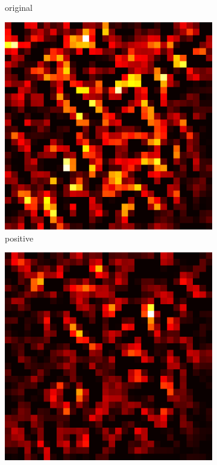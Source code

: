 \documentclass[preprint,12pt]{elsarticle}
\begin{document}
\begin{figure}
\begin{subfigure}{0.14\linewidth}
        \caption{original}
    \end{subfigure}
    \hfill
    \begin{subfigure}{0.14\textwidth}
        \centering
        \includegraphics[width=\linewidth]{../visualizations/examples/cifar10/resnet18/positive_saliency_map/5.png}
        \caption{positive}
    \end{subfigure}
    \hfill
    \begin{subfigure}{0.14\textwidth}
        \centering
        \includegraphics[width=\linewidth]{../visualizations/examples/cifar10/resnet18/negative_saliency_map/5.png}

\end{subfigure}
\end{figure}
\end{document}
